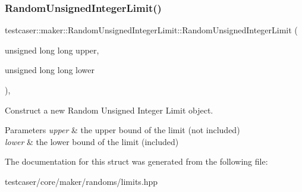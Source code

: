 \subsubsection{\texorpdfstring{RandomUnsignedIntegerLimit()}{RandomUnsignedIntegerLimit()}\hspace{0.1cm}{\footnotesize\ttfamily [2/2]}}
{\footnotesize\ttfamily testcaser\+::maker\+::\+Random\+Unsigned\+Integer\+Limit\+::\+Random\+Unsigned\+Integer\+Limit (\begin{DoxyParamCaption}\item[{unsigned long long}]{upper,  }\item[{unsigned long long}]{lower }\end{DoxyParamCaption})\hspace{0.3cm}{\ttfamily [inline]}, {\ttfamily [explicit]}}



Construct a new Random Unsigned Integer Limit object. 


\begin{DoxyParams}{Parameters}
{\em upper} & the upper bound of the limit (not included) \\
\hline
{\em lower} & the lower bound of the limit (included) \\
\hline
\end{DoxyParams}


The documentation for this struct was generated from the following file\+:\begin{DoxyCompactItemize}
\item 
testcaser/core/maker/randoms/limits.\+hpp\end{DoxyCompactItemize}

